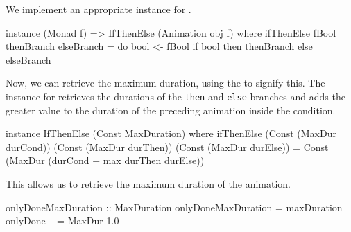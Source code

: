 We implement an appropriate  instance for .

\begin{code}
instance (Monad f) => IfThenElse (Animation obj f) where
  ifThenElse fBool thenBranch elseBranch = do
    bool <- fBool
    if bool then thenBranch else elseBranch
\end{code}

Now, we can retrieve the maximum duration, using the 
 to signify this. The instance for  retrieves the
durations of the \texttt{then} and \texttt{else} branches and adds the greater
value to the duration of the preceding animation inside the condition.

\begin{code}
instance IfThenElse (Const MaxDuration) where
  ifThenElse (Const (MaxDur durCond)) (Const (MaxDur durThen))
             (Const (MaxDur durElse)) =
    Const (MaxDur (durCond + max durThen durElse))
\end{code}

This allows us to retrieve the maximum duration of the  animation.

\begin{spec}
onlyDoneMaxDuration :: MaxDuration
onlyDoneMaxDuration = maxDuration onlyDone -- = MaxDur 1.0
\end{spec}
